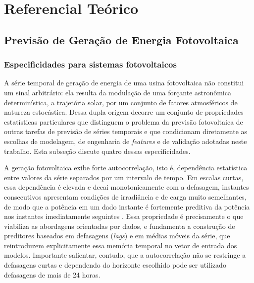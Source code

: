 \chapter{Referencial Teórico}
\label{cap:referencial_teorico}

\section{Previsão de Geração de Energia Fotovoltaica}
\label{sec:previsao_fv}

\subsection{Especificidades para sistemas fotovoltaicos}
\label{subsec:especificidades_fv}



A série temporal de geração de energia de uma usina fotovoltaica não constitui um sinal
arbitrário: ela resulta da modulação de uma forçante astronômica determinística, a
trajetória solar, por um conjunto de fatores atmosféricos de natureza estocástica. Dessa
dupla origem decorre um conjunto de propriedades estatísticas particulares que distinguem o
problema da previsão fotovoltaica de outras tarefas de previsão de séries temporais e que
condicionam diretamente as escolhas de modelagem, de engenharia de \emph{features} e de
validação adotadas neste trabalho. Esta subseção discute quatro dessas especificidades.

A geração fotovoltaica exibe forte autocorrelação, isto é, dependência estatística entre
valores da série separados por um intervalo de tempo. Em escalas curtas, essa dependência
é elevada e decai monotonicamente com a defasagem, instantes consecutivos apresentam
condições de irradiância e de carga muito semelhantes, de modo que a potência em um dado
instante é fortemente preditiva da potência nos instantes imediatamente seguintes
\cite{Zhou2022}. Essa propriedade é precisamente o que viabiliza as abordagens orientadas
por dados, e fundamenta a construção de preditores baseados em defasagens (\emph{lags}) e em médias móveis da série, que reintroduzem explicitamente essa memória temporal no vetor de entrada dos modelos. Importante salientar, contudo, que a autocorrelação não se restringe a defasagens curtas e dependendo do horizonte escolhido pode ser utilizado defasagens de mais de 24 horas.

